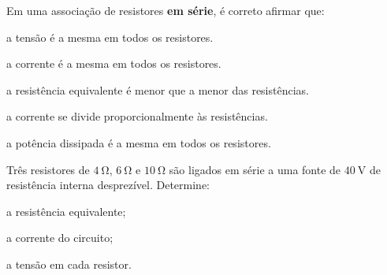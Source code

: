 \begin{questao}[1]{}
Em uma associação de resistores \textbf{em série}, é correto afirmar que:
\begin{alternativas}
\item a tensão é a mesma em todos os resistores.
\item a corrente é a mesma em todos os resistores.
\item a resistência equivalente é menor que a menor das resistências.
\item a corrente se divide proporcionalmente às resistências.
\item a potência dissipada é a mesma em todos os resistores.
\end{alternativas}
\end{questao}

\begin{questao}[1]{}
Três resistores de $\SI{4}{\ohm}$, $\SI{6}{\ohm}$ e $\SI{10}{\ohm}$ são ligados em
série a uma fonte de $\SI{40}{\volt}$ de resistência interna desprezível.
Determine:
\begin{itensq}
\item a resistência equivalente;
\item a corrente do circuito;
\item a tensão em cada resistor.
\end{itensq}
\end{questao}

